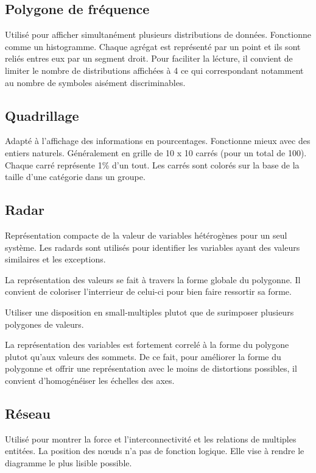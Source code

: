 \documentclass[a4paper,12pt]{article}
\begin{document}
\begin{multicols}{2}
\subsection*{Polygone de fréquence}
\label{sec:org2eea87f}
Utilisé pour afficher simultanément plusieurs distributions de données. Fonctionne comme un histogramme. Chaque agrégat est représenté par un point et ils sont reliés entres eux par un segment droit. Pour faciliter la lécture, il convient de limiter le nombre de distributions affichées à 4 \autocite{alansmithLexiqueVisuel} ce qui correspondant notamment au nombre de symboles aisément discriminables.
\subsection*{Quadrillage}
\label{sec:org9cd82c3}
Adapté à l'affichage des informations en pourcentages. Fonctionne mieux avec des entiers naturels. \autocite{alansmithLexiqueVisuel} Généralement en grille de 10 x 10 carrés (pour un total de 100). Chaque carré représente 1\% d'un tout. Les carrés sont colorés sur la base de la taille d'une catégorie dans un groupe. \autocite{mikeyiHowChooseRight2020}
\subsection*{Radar}
\label{sec:org69adeab}
Représentation compacte de la valeur de variables hétérogènes pour un seul système. \autocite{alansmithLexiqueVisuel} Les radards sont utilisés pour identifier les variables ayant des valeurs similaires et les exceptions. \autocite{sosulskiGraphics2019}

La représentation des valeurs se fait à travers la forme globale du polygonne. Il convient de coloriser l'interrieur de celui-ci pour bien faire ressortir sa forme. \autocite{jonathanschwabishRelationship2021}

Utiliser une disposition en small-multiples plutot que de surimposer plusieurs polygones de valeurs. \autocite{jonathanschwabishRelationship2021}

La représentation des variables est fortement correlé à la forme du polygone plutot qu'aux valeurs des sommets. \autocite{sosulskiGraphics2019} De ce fait, pour améliorer la forme du polygonne et offrir une représentation avec le moins de distortions possibles, il convient d'homogénéiser les échelles des axes.
\subsection*{Réseau}
\label{sec:org9f58259}
Utilisé pour montrer la force et l'interconnectivité et les relations de multiples entitées. \autocite{alansmithLexiqueVisuel} La position des nœuds n’a pas de fonction logique. Elle vise à rendre le diagramme le plus lisible possible. \autocite{mikeyiHowChooseRight2020}




\end{multicols}
\end{document}
